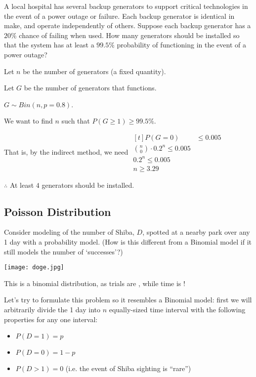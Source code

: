 \begin{example}
    A  local hospital has several backup generators to support critical technologies in the event of a power outage or failure. Each backup generator is identical in make, and operate independently of others. Suppose each backup generator has a $20\%$ chance of failing when used. How many generators should be installed so that the system has at least a $99.5\%$ probability of functioning in the event of a power outage?

    Let $n$ be the number of generators (a fixed quantity).

    Let $G$ be the number of generators that functions. 

    $G \sim Bin(n, p = 0.8)$. 

    We want to find $n$ such that $P(G \ge 1) \ge 99.5\%$. 

    That is, by the indirect method, we need $\begin{aligned}[t]
        P(G = 0) & \le 0.005 \\
        \binom{n}{0} \cdot 0.2^n \le 0.005 \\
        0.2^n \le 0.005 \\
        n \ge 3.29
    \end{aligned}$

    $\therefore$ At least $4$ generators should be installed. 
\end{example}

\subsection{Poisson Distribution}

Consider modeling of the number of Shiba, $D$, spotted at a nearby park over any 1 day with a probability model. (How is this different from a Binomial model if it still models the number of `successes'?)

\begin{center} \texttt{[image: doge.jpg]} \end{center}

This is  a binomial distribution, as trials are , while time is ! 

Let's try to formulate this problem so it resembles a Binomial model: first we will arbitrarily divide the 1 day into $n$ equally-sized time interval with the following properties for any one interval:

\begin{itemize}
    \item $P(D = 1) = p$
    \item $P(D = 0) = 1 - p$
    \item $P(D > 1) = 0$ (i.e. the event of Shiba sighting is ``rare'')
\end{itemize}

